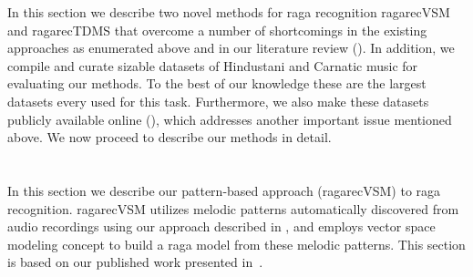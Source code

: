 In this section we describe two novel methods for \gls{raga} recognition \acrshort{ragarecVSM} and \acrshort{ragarecTDMS} that overcome a number of shortcomings in the existing approaches as enumerated above and in our literature review (). In addition, we compile and curate sizable datasets of Hindustani and Carnatic music for evaluating our methods. To the best of our knowledge these are the largest datasets every used for this task. Furthermore, we also make these datasets publicly available online (), which addresses another important issue mentioned above. We now proceed to describe our methods in detail. 




\section{}
\label{sec:pattern_based_raga_recognition}

In this section we describe our pattern-based approach (\acrshort{ragarecVSM}) to \gls{raga} recognition. \acrshort{ragarecVSM} utilizes melodic patterns automatically discovered from audio recordings using our approach described in , and employs vector space modeling concept to build a \gls{raga} model from these melodic patterns. This section is based on our published work presented in~\cite{gulatiphrase_2016}.

